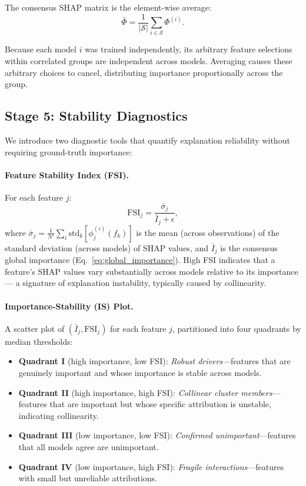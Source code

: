 \documentclass[11pt]{article}
\begin{document}
The consensus SHAP matrix is the element-wise average:
\begin{equation}
  \bar{\Phi} = \frac{1}{|\mathcal{S}|} \sum_{i \in \mathcal{S}} \Phi^{(i)}.
  \label{eq:consensus}
\end{equation}

Because each model $i$ was trained independently, its arbitrary feature
selections within correlated groups are independent across models.
Averaging causes these arbitrary choices to cancel, distributing
importance proportionally across the group.

\subsection{Stage 5: Stability Diagnostics}

We introduce two diagnostic tools that quantify explanation reliability
without requiring ground-truth importance:

\paragraph{Feature Stability Index (FSI).}
For each feature $j$:
\begin{equation}
  \text{FSI}_j = \frac{\bar{\sigma}_j}{\bar{I}_j + \epsilon},
  \label{eq:fsi}
\end{equation}
where $\bar{\sigma}_j = \frac{1}{N'}\sum_i \text{std}_k[\phi_j^{(i)}(f_k)]$
is the mean (across observations) of the standard deviation (across models)
of SHAP values, and $\bar{I}_j$ is the consensus global importance
(Eq.~\ref{eq:global_importance}). High FSI indicates that a feature's
SHAP values vary substantially across models relative to its importance---
a signature of explanation instability, typically caused by collinearity.

\paragraph{Importance-Stability (IS) Plot.}
A scatter plot of $(\bar{I}_j, \text{FSI}_j)$ for each feature $j$,
partitioned into four quadrants by median thresholds:
\begin{itemize}
  \item \textbf{Quadrant I} (high importance, low FSI): \emph{Robust
    drivers}---features that are genuinely important and whose importance
    is stable across models.
  \item \textbf{Quadrant II} (high importance, high FSI): \emph{Collinear
    cluster members}---features that are important but whose specific
    attribution is unstable, indicating collinearity.
  \item \textbf{Quadrant III} (low importance, low FSI): \emph{Confirmed
    unimportant}---features that all models agree are unimportant.
  \item \textbf{Quadrant IV} (low importance, high FSI): \emph{Fragile
    interactions}---features with small but unreliable attributions.
\end{itemize}
\end{document}
